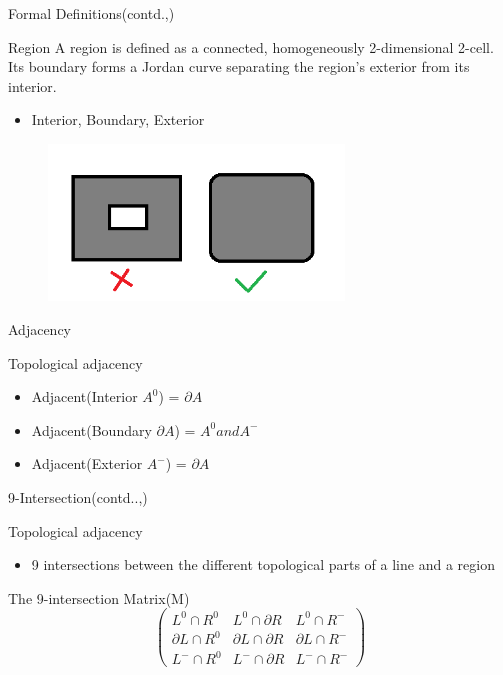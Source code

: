 \begin{frame}{Formal Definitions(contd.,)}
	\begin{block}{Region}
	A region is defined as a connected, homogeneously 2-dimensional 2-cell. Its boundary forms a Jordan curve separating the region's exterior from its interior.
	\begin{itemize}
	\item Interior, Boundary, Exterior
	\end{itemize}
\end{block}		
		\begin{figure}
		\includegraphics[width=0.7\textwidth]{images/region.png}
\end{figure}
\end{frame}

\begin{frame}{Adjacency}
	\begin{block}{Topological adjacency}
	\begin{itemize}
	\item Adjacent(Interior {$A^0$}) = $\partial A$
	\item Adjacent(Boundary {$\partial A$}) = $A^0 and A^-$
	\item Adjacent(Exterior {$A^-$}) = $\partial A$
	\end{itemize}
\end{block}		
\end{frame}

\begin{frame}{9-Intersection(contd..,)}
	\begin{block}{Topological adjacency}
	\begin{itemize}
	\item 9 intersections between the different topological parts of a line and a region
	\end{itemize}
\end{block}		
\begin{block}{The 9-intersection Matrix(M)}
\[ \left( \begin{array}{ccc}
L^0 \cap R^0  & L^0 \cap \partial R & L^0 \cap R^- \\
\partial L \cap R^0 & \partial L \cap \partial R & \partial L \cap R^- \\
L^- \cap R^0 & L^- \cap \partial R & L^- \cap R^- \end{array} \right)\] 
\end{block}
\end{frame}

